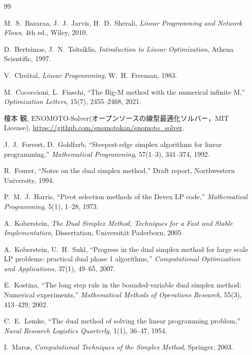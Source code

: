 \documentclass[11pt,a4paper]{ltjsarticle}
\theoremstyle{plain}
\theoremstyle{definition}
\theoremstyle{remark}
\begin{document}
\begin{thebibliography}{99}

M.~S.~Bazaraa, J.~J.~Jarvis, H.~D.~Sherali,
\textit{Linear Programming and Network Flows}, 4th ed.,
Wiley, 2010.

D.~Bertsimas, J.~N.~Tsitsiklis,
\textit{Introduction to Linear Optimization},
Athena Scientific, 1997.

V.~Chv\'atal,
\textit{Linear Programming},
W.~H.~Freeman, 1983.

M.~Cococcioni, L.~Fiaschi,
``The Big-M method with the numerical infinite M,''
\textit{Optimization Letters}, 15(7), 2455--2468, 2021.

榎本 観,
ENOMOTO-Solver(オープンソースの線型最適化ソルバー，MIT License),
\url{https://github.com/enomotokan/enomoto_solver}.

J.~J.~Forrest, D.~Goldfarb,
``Steepest-edge simplex algorithms for linear programming,''
\textit{Mathematical Programming}, 57(1--3), 341--374, 1992.

R.~Fourer,
``Notes on the dual simplex method,''
Draft report, Northwestern University, 1994.

P.~M.~J.~Harris,
``Pivot selection methods of the Devex LP code,''
\textit{Mathematical Programming}, 5(1), 1--28, 1973.

A.~Koberstein,
\textit{The Dual Simplex Method, Techniques for a Fast and Stable Implementation},
Dissertation, Universit\"at Paderborn, 2005.

A.~Koberstein, U.~H.~Suhl,
``Progress in the dual simplex method for large scale LP problems: practical dual phase 1 algorithms,''
\textit{Computational Optimization and Applications}, 37(1), 49--65, 2007.

E.~Kostina,
``The long step rule in the bounded-variable dual simplex method: Numerical experiments,''
\textit{Mathematical Methods of Operations Research}, 55(3), 413--429, 2002.

C.~E.~Lemke,
``The dual method of solving the linear programming problem,''
\textit{Naval Research Logistics Quarterly}, 1(1), 36--47, 1954.

I.~Maros,
\textit{Computational Techniques of the Simplex Method},
Springer, 2003.


\end{thebibliography}
\end{document}
